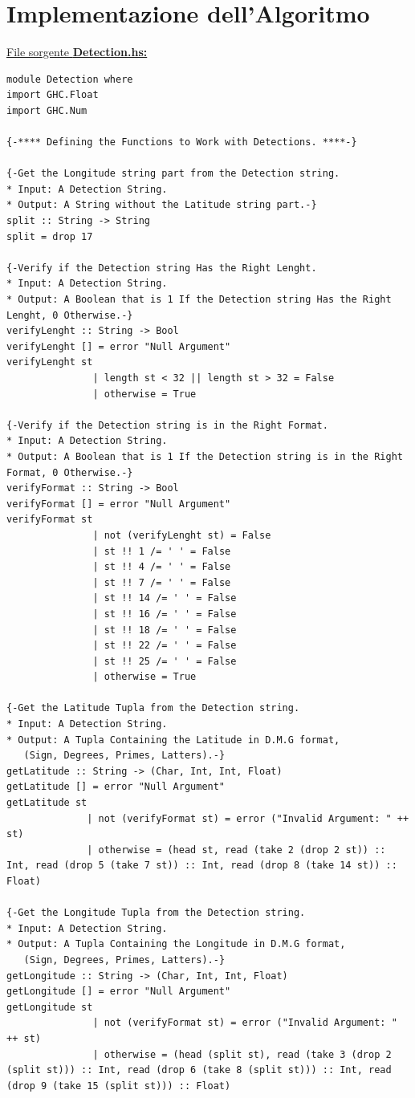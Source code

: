\documentclass{article}
\begin{document}
\section{Implementazione dell'Algoritmo}
\raggedright
\underline{File sorgente \textbf{Detection.hs:}}
\lstset{language=Haskell}
\begin{lstlisting}
module Detection where
import GHC.Float
import GHC.Num

{-**** Defining the Functions to Work with Detections. ****-}
            
{-Get the Longitude string part from the Detection string.
* Input: A Detection String.
* Output: A String without the Latitude string part.-}
split :: String -> String
split = drop 17 

{-Verify if the Detection string Has the Right Lenght.
* Input: A Detection String.
* Output: A Boolean that is 1 If the Detection string Has the Right Lenght, 0 Otherwise.-}
verifyLenght :: String -> Bool
verifyLenght [] = error "Null Argument"
verifyLenght st
               | length st < 32 || length st > 32 = False
               | otherwise = True

{-Verify if the Detection string is in the Right Format.
* Input: A Detection String.
* Output: A Boolean that is 1 If the Detection string is in the Right Format, 0 Otherwise.-}
verifyFormat :: String -> Bool
verifyFormat [] = error "Null Argument"
verifyFormat st
               | not (verifyLenght st) = False
               | st !! 1 /= ' ' = False
               | st !! 4 /= ' ' = False
               | st !! 7 /= ' ' = False
               | st !! 14 /= ' ' = False
               | st !! 16 /= ' ' = False
               | st !! 18 /= ' ' = False
               | st !! 22 /= ' ' = False
               | st !! 25 /= ' ' = False
               | otherwise = True

{-Get the Latitude Tupla from the Detection string.
* Input: A Detection String.
* Output: A Tupla Containing the Latitude in D.M.G format,
   (Sign, Degrees, Primes, Latters).-}
getLatitude :: String -> (Char, Int, Int, Float)
getLatitude [] = error "Null Argument"
getLatitude st
              | not (verifyFormat st) = error ("Invalid Argument: " ++ st)
              | otherwise = (head st, read (take 2 (drop 2 st)) :: Int, read (drop 5 (take 7 st)) :: Int, read (drop 8 (take 14 st)) :: Float)

{-Get the Longitude Tupla from the Detection string.
* Input: A Detection String.
* Output: A Tupla Containing the Longitude in D.M.G format,
   (Sign, Degrees, Primes, Latters).-}
getLongitude :: String -> (Char, Int, Int, Float)
getLongitude [] = error "Null Argument"
getLongitude st
               | not (verifyFormat st) = error ("Invalid Argument: " ++ st)
               | otherwise = (head (split st), read (take 3 (drop 2 (split st))) :: Int, read (drop 6 (take 8 (split st))) :: Int, read (drop 9 (take 15 (split st))) :: Float)


\end{lstlisting}
\end{document}
